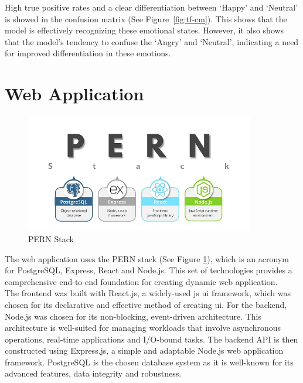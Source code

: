 \indent High true positive rates and a clear differentiation between `Happy' and `Neutral' is showed in the confusion matrix (See Figure~\ref{fig:tf-cm}).
This shows that the model is effectively recognizing these emotional states.
However, it also shows that the model's tendency to confuse the `Angry' and `Neutral', indicating a need for improved differentiation in these emotions.

\section{Web Application}
\begin{figure}[H]
    \centering
    \includegraphics[width=10cm]{Images/pern.png}
    \caption{PERN Stack \citep{alves_2023_get}}
    \label{fig:pern}
\end{figure}
The web application uses the PERN stack (See Figure \ref{fig:pern}), which is an acronym for PostgreSQL, Express, React and Node.js.
This set of technologies provides a comprehensive end-to-end foundation for creating dynamic web application.
\\
\indent The frontend was built with React.js, a widely-used \gls{js} \gls{ui} framework, which was chosen for its declarative and effective method of creating \gls{ui}.
For the backend, Node.js was chosen for its non-blocking, event-driven architecture.
This architecture is well-suited for managing workloads that involve asynchronous operations, real-time applications and I/O-bound tasks.
The backend API is then constructed using Express.js, a simple and adaptable Node.js web application framework.
PostgreSQL is the chosen database system as it is well-known for its advanced features, data integrity and robustness.
